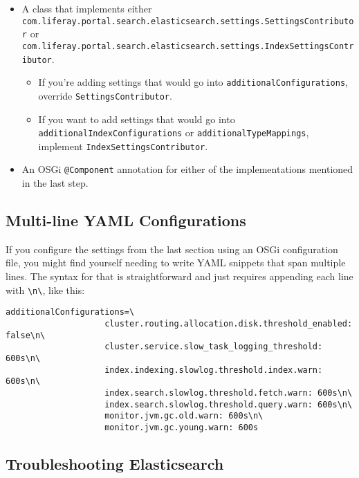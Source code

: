 \begin{itemize}
\tightlist
\item
  A class that implements either
  \texttt{com.liferay.portal.search.elasticsearch.settings.SettingsContributor}
  or
  \texttt{com.liferay.portal.search.elasticsearch.settings.IndexSettingsContributor}.

  \begin{itemize}
  \tightlist
  \item
    If you're adding settings that would go into
    \texttt{additionalConfigurations}, override
    \texttt{SettingsContributor}.
  \item
    If you want to add settings that would go into
    \texttt{additionalIndexConfigurations} or
    \texttt{additionalTypeMappings}, implement
    \texttt{IndexSettingsContributor}.
  \end{itemize}
\item
  An OSGi \texttt{@Component} annotation for either of the
  implementations mentioned in the last step.
\end{itemize}

\noindent\hrulefill

\subsection{Multi-line YAML
Configurations}\label{multi-line-yaml-configurations}

If you configure the settings from the last section using an OSGi
configuration file, you might find yourself needing to write YAML
snippets that span multiple lines. The syntax for that is
straightforward and just requires appending each line with
\texttt{\textbackslash{}n\textbackslash{}}, like this:

\begin{verbatim}
additionalConfigurations=\
                    cluster.routing.allocation.disk.threshold_enabled: false\n\
                    cluster.service.slow_task_logging_threshold: 600s\n\
                    index.indexing.slowlog.threshold.index.warn: 600s\n\
                    index.search.slowlog.threshold.fetch.warn: 600s\n\
                    index.search.slowlog.threshold.query.warn: 600s\n\
                    monitor.jvm.gc.old.warn: 600s\n\
                    monitor.jvm.gc.young.warn: 600s
\end{verbatim}

\subsection{Troubleshooting
Elasticsearch}\label{troubleshooting-elasticsearch}

